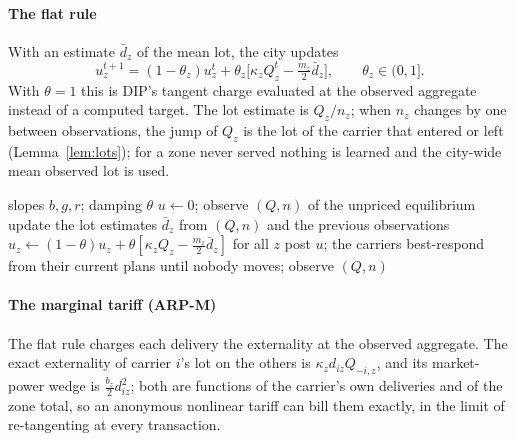 \documentclass[preprint,12pt]{elsarticle}
\theoremstyle{definition}
\theoremstyle{remark}
\begin{document}
\paragraph{The flat rule} With an estimate $\bar d_z$ of the mean lot, the city updates
\begin{equation}\label{eq:rule}
u^{t+1}_z=(1-\theta_z)u^t_z+\theta_z\big[\kappa_zQ^t_z-\tfrac{m_z}{2}\bar d_z\big],\qquad\theta_z\in(0,1].
\end{equation}
With $\theta=1$ this is DIP's tangent charge evaluated at the observed aggregate instead of a computed target. The lot estimate is $Q_z/n_z$; when $n_z$ changes by one between observations, the jump of $Q_z$ is the lot of the carrier that entered or left (Lemma~\ref{lem:lots}); for a zone never served nothing is learned and the city-wide mean observed lot is used.

\begin{algorithm}[t]
\caption{ARP flat rule}\label{alg:arp}
\begin{algorithmic}[1]
\Require slopes $b,g,r$; damping $\theta$
\State $u\gets0$; observe $(Q,n)$ of the unpriced equilibrium
\Repeat
  \State update the lot estimates $\bar d_z$ from $(Q,n)$ and the previous observations
  \State $u_z\gets(1-\theta)u_z+\theta[\kappa_zQ_z-\tfrac{m_z}{2}\bar d_z]$ for all $z$
  \State post $u$; the carriers best-respond from their current plans until nobody moves; observe $(Q,n)$
\end{algorithmic}
\end{algorithm}

\paragraph{The marginal tariff (ARP-M)} The flat rule charges each delivery the externality at the observed aggregate. The exact externality of carrier $i$'s lot on the others is $\kappa_zd_{iz}Q_{-i,z}$, and its market-power wedge is $\tfrac{b_z}{2}d_{iz}^2$; both are functions of the carrier's own deliveries and of the zone total, so an anonymous nonlinear tariff can bill them exactly, in the limit of re-tangenting at every transaction.
\end{document}

